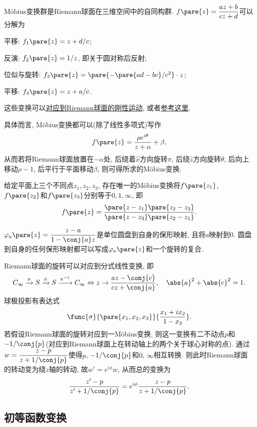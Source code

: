 \documentclass[../ComplexVariable.tex]{subfiles}
\begin{document}
M\"obius变换群是Riemann球面在三维空间中的自同构群. $\displaystyle f\pare{z} = \frac{az+b}{cz+d}$可以分解为
\begin{cenum}
    \item 平移: $f_1\pare{z} = z + d/c$;
    \item 反演: $f_2\pare{z} = 1/z$, 即关于圆对称后反射;
    \item 位似与旋转: $f_3\pare{z} = \pare{-\pare{ad-bc}/c^2}\cdot z$;
    \item 平移: $f_4\pare{z} = z+a/c$.
\end{cenum}
这些变换可以\href{https://www.youtube.com/watch?v=JX3VmDgiFnY&app=desktop}{对应到Riemann球面的刚性运动}, 或者\href{https://en.wikipedia.org/wiki/M%C3%B6bius_transformation}{参考这里}.
\par
具体而言, M\"obius变换都可以(除了线性多项式)写作
\[ f\pare{z} = \frac{\rho e^{i\theta}}{z+\alpha} + \beta, \]
从而若将Riemann球面放置在$-\alpha$处, 后绕着$\hat x$方向旋转$\pi$, 后绕$\hat z$方向旋转$\theta$, 后向上移动$\rho - 1$, 后平行于平面移动$\beta$, 则可得所求的M\"obius变换.
\par
给定平面上三个不同点$z_1,z_2,z_3$, 存在唯一的M\"obius变换将$f\pare{z_1}$, $f\pare{z_2}$和$f\pare{z_3}$分别等于$0,1,\infty$, 即
\[ f\pare{z} = \frac{\pare{z-z_1}\pare{z_2-z_3}}{\pare{z-z_3}\pare{z_2-z_1}}. \]
\par
$\varphi_a\pare{z} = \displaystyle \frac{z-a}{1-\conj{a}z}$是单位圆盘到自身的保形映射, 且将$a$映射到$0$. 圆盘到自身的任何保形映射都可以写成$\varphi_a\pare{z}$和一个旋转的复合.
\par
Riemann球面的旋转可以对应到分式线性变换, 即
\[ C_\infty \xrightarrow{\pi} S \xrightarrow{\phi} S \xrightarrow{\pi^{-1}} C_\infty \Leftrightarrow z\rightarrow \frac{az - \conj{c}}{cz+\conj{a}},\quad \abs{a}^2 + \abs{c}^2 = 1. \]
球极投影有表达式
\[ \func{\sigma}{\pare{x_1,x_2,x_3}}{\frac{x_1+ix_2}{1-x_3}}. \]
若假设Riemann球面的旋转对应到一M\"obius变换, 则这一变换有二不动点$p$和$-1/\conj{p}$(对应到Riemann球面上在转动轴上的两个关于球心对称的点). 通过$\displaystyle w = \frac{z-p}{z+1/\conj{p}}$使得$p$, $-1/\conj{p}$和$0$, $\infty$相互转换. 则此时Riemann球面的转动变为绕$z$轴的转动, 故$w'=e^{i\phi}w$, 从而总的变换为
\[ \frac{z'-p}{z'+1/\conj{p}} = e^{i\phi}\frac{z-p}{z+1/\conj{p}}. \]



\subsection{初等函数变换} %
\label{sub:初等函数变换}
\end{document}
